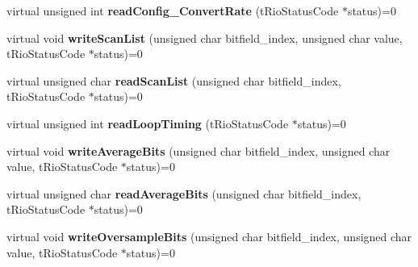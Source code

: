 \begin{DoxyCompactItemize}
\item 
\hypertarget{classnFPGA_1_1nFRC__2012__1__6__4_1_1tAI_a49c169683a9dc631a04ddafe43a89f0a}{
virtual unsigned int {\bfseries readConfig\_\-ConvertRate} (tRioStatusCode $\ast$status)=0}
\label{classnFPGA_1_1nFRC__2012__1__6__4_1_1tAI_a49c169683a9dc631a04ddafe43a89f0a}

\item 
\hypertarget{classnFPGA_1_1nFRC__2012__1__6__4_1_1tAI_aab1c8f1e4bbe3381b1803459d8c10f02}{
virtual void {\bfseries writeScanList} (unsigned char bitfield\_\-index, unsigned char value, tRioStatusCode $\ast$status)=0}
\label{classnFPGA_1_1nFRC__2012__1__6__4_1_1tAI_aab1c8f1e4bbe3381b1803459d8c10f02}

\item 
\hypertarget{classnFPGA_1_1nFRC__2012__1__6__4_1_1tAI_acfdaf6d3e9c32fcdc0d117c6797a31c5}{
virtual unsigned char {\bfseries readScanList} (unsigned char bitfield\_\-index, tRioStatusCode $\ast$status)=0}
\label{classnFPGA_1_1nFRC__2012__1__6__4_1_1tAI_acfdaf6d3e9c32fcdc0d117c6797a31c5}

\item 
\hypertarget{classnFPGA_1_1nFRC__2012__1__6__4_1_1tAI_a1afb0028afbe9f40a64784dc5d71e931}{
virtual unsigned int {\bfseries readLoopTiming} (tRioStatusCode $\ast$status)=0}
\label{classnFPGA_1_1nFRC__2012__1__6__4_1_1tAI_a1afb0028afbe9f40a64784dc5d71e931}

\item 
\hypertarget{classnFPGA_1_1nFRC__2012__1__6__4_1_1tAI_a70305b35097258611e3d449ac26263d3}{
virtual void {\bfseries writeAverageBits} (unsigned char bitfield\_\-index, unsigned char value, tRioStatusCode $\ast$status)=0}
\label{classnFPGA_1_1nFRC__2012__1__6__4_1_1tAI_a70305b35097258611e3d449ac26263d3}

\item 
\hypertarget{classnFPGA_1_1nFRC__2012__1__6__4_1_1tAI_a4b29efae19a86a6837d30ceb6f492040}{
virtual unsigned char {\bfseries readAverageBits} (unsigned char bitfield\_\-index, tRioStatusCode $\ast$status)=0}
\label{classnFPGA_1_1nFRC__2012__1__6__4_1_1tAI_a4b29efae19a86a6837d30ceb6f492040}

\item 
\hypertarget{classnFPGA_1_1nFRC__2012__1__6__4_1_1tAI_adb6ee41cee889e40fbf229e736eef954}{
virtual void {\bfseries writeOversampleBits} (unsigned char bitfield\_\-index, unsigned char value, tRioStatusCode $\ast$status)=0}
\label{classnFPGA_1_1nFRC__2012__1__6__4_1_1tAI_adb6ee41cee889e40fbf229e736eef954}


\end{DoxyCompactItemize}
